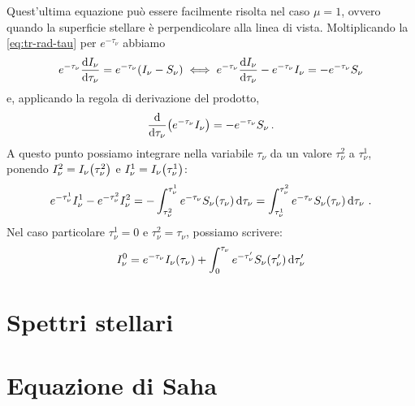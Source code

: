     Quest'ultima equazione può essere facilmente risolta nel caso $\mu = 1$, ovvero quando la superficie stellare è perpendicolare alla linea di vista. Moltiplicando la \eqref{eq:tr-rad-tau} per $e^{-\tau_\nu}$  abbiamo
    \begin{equation*}
        e^{-\tau_\nu} \dv{I_\nu}{\tau_\nu}
        = e^{-\tau_\nu}\pqty{I_{\nu} - S_{\nu}}
        \iff e^{-\tau_\nu} \dv{I_\nu}{\tau_\nu} - e^{-\tau_\nu}I_{\nu}
        = -e^{-\tau_\nu} S_{\nu}
    \end{equation*}
    e, applicando la regola di derivazione del prodotto,
    \begin{equation*}
        \dv{\tau_\nu}\pqty{e^{-\tau_\nu}I_{\nu}} = -e^{-\tau_\nu} S_{\nu}
        \myperiod
    \end{equation*}
    A questo punto possiamo integrare nella variabile $\tau_\nu$ da un valore $\tau_\nu^2$ a $\tau_\nu^1$, ponendo $I_{\nu}^2 = I_{\nu}\pqty{\tau_\nu^2}$ e $I_{\nu}^1 = I_{\nu}\pqty{\tau_\nu^1}$:
    \begin{equation*}
        e^{-\tau_\nu^1}I_{\nu}^1 - e^{-\tau_\nu^2}I_{\nu}^2
        = -\int_{\tau_\nu^2}^{\tau_\nu^1} e^{-\tau_\nu} S_{\nu}\pqty{\tau_\nu} \dd{\tau_\nu}
        = \int_{\tau_\nu^1}^{\tau_\nu^2} e^{-\tau_\nu} S_{\nu}\pqty{\tau_\nu} \dd{\tau_\nu}
        \myperiod
    \end{equation*}
    Nel caso particolare $\tau_\nu^1 = 0$ e $\tau_\nu^2 = \tau_\nu$, possiamo scrivere:
    \begin{equation*}
        I_\nu^0 = e^{-\tau_\nu}I_{\nu}\pqty{\tau_\nu} + \int_0^{\tau_\nu} e^{-\tau_{\nu}'} S_{\nu}\pqty{\tau_{\nu}'} \dd{\tau_{\nu}'}
    \end{equation*}   
\section{Spettri stellari}
\section{Equazione di Saha}